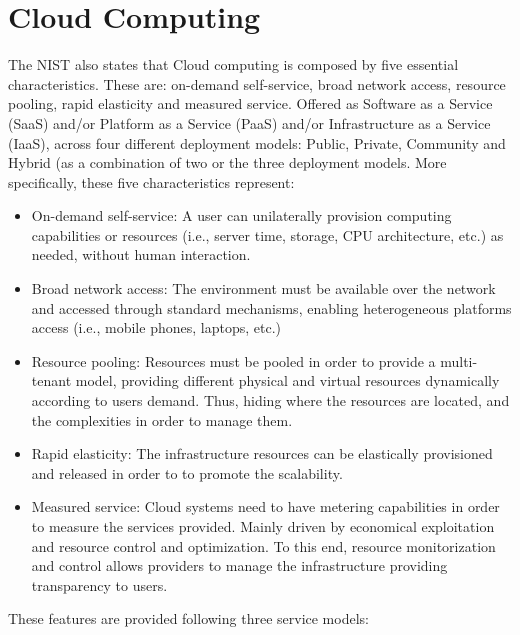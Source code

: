 \section{Cloud Computing}
The NIST also states that Cloud computing is composed by five essential
characteristics. These are: on-demand self-service, broad network access,
resource pooling, rapid elasticity and measured service. Offered as Software
as a Service (SaaS) and/or Platform as a Service (PaaS) and/or Infrastructure
as a Service (IaaS), across four different deployment models: Public, Private,
Community and Hybrid (as a combination of two or the three deployment
models.
More specifically, these five characteristics represent:
\begin{itemize}
\item On-demand self-service: A user can unilaterally provision computing
capabilities or resources (i.e., server time, storage, CPU architecture,
etc.) as needed, without human interaction.
\item Broad network access: The environment must be available over the
network and accessed through standard mechanisms, enabling heterogeneous
platforms access (i.e., mobile phones, laptops, etc.)
\item Resource pooling: Resources must be pooled in order to provide a
multi-tenant model, providing different physical and virtual resources
dynamically according to users demand. Thus, hiding where the resources
are located, and the complexities in order to manage them.
\item Rapid elasticity: The infrastructure resources can be elastically provisioned
and released in order to to promote the scalability.
\item Measured service: Cloud systems need to have metering capabilities
in order to measure the services provided. Mainly driven by economical
exploitation and resource control and optimization. To this end,
resource monitorization and control allows providers to manage the infrastructure
providing transparency to users.
\end{itemize}
These features are provided following three service models:
